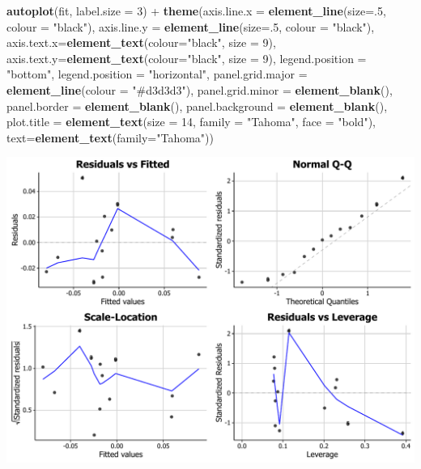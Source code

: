 \documentclass[]{article}
\newenvironment{Shaded}{\begin{snugshade}}{\end{snugshade}}
\newcommand{\KeywordTok}[1]{\textcolor[rgb]{0.13,0.29,0.53}{\textbf{{#1}}}}
\newcommand{\DataTypeTok}[1]{\textcolor[rgb]{0.13,0.29,0.53}{{#1}}}
\newcommand{\DecValTok}[1]{\textcolor[rgb]{0.00,0.00,0.81}{{#1}}}
\newcommand{\StringTok}[1]{\textcolor[rgb]{0.31,0.60,0.02}{{#1}}}
\newcommand{\NormalTok}[1]{{#1}}
\begin{document}
\begin{Shaded}
\begin{Highlighting}[]
\KeywordTok{autoplot}\NormalTok{(fit, }\DataTypeTok{label.size =} \DecValTok{3}\NormalTok{) +}\StringTok{ }\KeywordTok{theme}\NormalTok{(}\DataTypeTok{axis.line.x =} \KeywordTok{element_line}\NormalTok{(}\DataTypeTok{size=}\NormalTok{.}\DecValTok{5}\NormalTok{, }\DataTypeTok{colour =} \StringTok{"black"}\NormalTok{),}
            \DataTypeTok{axis.line.y =} \KeywordTok{element_line}\NormalTok{(}\DataTypeTok{size=}\NormalTok{.}\DecValTok{5}\NormalTok{, }\DataTypeTok{colour =} \StringTok{"black"}\NormalTok{),}
            \DataTypeTok{axis.text.x=}\KeywordTok{element_text}\NormalTok{(}\DataTypeTok{colour=}\StringTok{"black"}\NormalTok{, }\DataTypeTok{size =} \DecValTok{9}\NormalTok{), }
            \DataTypeTok{axis.text.y=}\KeywordTok{element_text}\NormalTok{(}\DataTypeTok{colour=}\StringTok{"black"}\NormalTok{, }\DataTypeTok{size =} \DecValTok{9}\NormalTok{), }
            \DataTypeTok{legend.position =} \StringTok{"bottom"}\NormalTok{, }\DataTypeTok{legend.position =} \StringTok{"horizontal"}\NormalTok{,}
            \DataTypeTok{panel.grid.major =} \KeywordTok{element_line}\NormalTok{(}\DataTypeTok{colour =} \StringTok{"#d3d3d3"}\NormalTok{), }
            \DataTypeTok{panel.grid.minor =} \KeywordTok{element_blank}\NormalTok{(), }
            \DataTypeTok{panel.border =} \KeywordTok{element_blank}\NormalTok{(), }\DataTypeTok{panel.background =} \KeywordTok{element_blank}\NormalTok{(),}
            \DataTypeTok{plot.title =} \KeywordTok{element_text}\NormalTok{(}\DataTypeTok{size =} \DecValTok{14}\NormalTok{, }\DataTypeTok{family =} \StringTok{"Tahoma"}\NormalTok{, }\DataTypeTok{face =} \StringTok{"bold"}\NormalTok{),}
            \DataTypeTok{text=}\KeywordTok{element_text}\NormalTok{(}\DataTypeTok{family=}\StringTok{"Tahoma"}\NormalTok{))}
\end{Highlighting}
\end{Shaded}

\begin{center}\includegraphics{0_all_posts_pdf/lr_22-1} \end{center}
\end{document}
